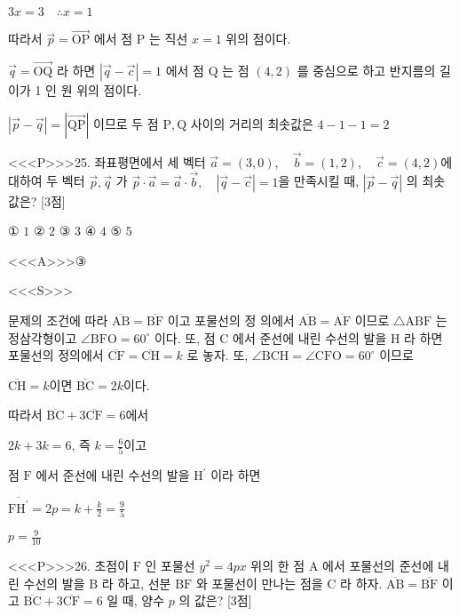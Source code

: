 \documentclass{oblivoir}
\begin{document}
$3 x=3 \quad \therefore x=1$

따라서 $\overrightarrow{p}=\overrightarrow{\mathrm{OP}}$ 에서 점 $\mathrm{P}$ 는 직선 $x=1$ 위의 점이다.

$\overrightarrow{q}=\overrightarrow{\mathrm{OQ}}$ 라 하면 $|\overrightarrow{q}-\overrightarrow{c}|=1$ 에서 점 $\mathrm{Q}$ 는 점 $(4,2)$ 를 중심으로 하고 반지름의 길이가 1 인 원 위의 점이다.

$|\overrightarrow{p}-\overrightarrow{q}|=|\overrightarrow{\mathrm{QP}}|$ 이므로 두 점 $\mathrm{P}, \mathrm{Q}$ 사이의 거리의 최솟값은 $4-1-1=2$


<<<P>>>25. 좌표평면에서 세 벡터 $\overrightarrow{a}=(3,0), \quad \overrightarrow{b}=(1,2), \quad \overrightarrow{c}=(4,2)$에 대하여 두 벡터 $\overrightarrow{p}, \overrightarrow{q}$ 가
$\overrightarrow{p} \cdot \overrightarrow{a}=\overrightarrow{a} \cdot \overrightarrow{b}, \quad|\overrightarrow{q}-\overrightarrow{c}|=1$을 만족시킬 때, $|\overrightarrow{p}-\overrightarrow{q}|$ 의 최솟값은? [3점]

① $1$
② $2$
③ $3$
④ $4$
⑤ $5$



<<<A>>>③

<<<S>>>



문제의 조건에 따라 $\overline{\mathrm{AB}}=\overline{\mathrm{BF}}$ 이고 포물선의 정 의에서 $\overline{\mathrm{AB}}=\overline{\mathrm{AF}}$ 이므로 $\triangle \mathrm{ABF}$ 는 정삼각형이고 $\angle \mathrm{BFO}=60^{\circ}$ 이다.
또, 점 $\mathrm{C}$ 에서 준선에 내린 수선의 발을 $\mathrm{H}$ 라 하면 포물선의 정의에서 $\overline{\mathrm{CF}}=\overline{\mathrm{CH}}=k$ 로 놓자.
또, $\angle \mathrm{BCH}=\angle \mathrm{CFO}=60^{\circ}$ 이므로

$\overline{\mathrm{CH}}=k$이면 $\overline{\mathrm{BC}}=2 k$이다.

따라서 $\overline{\mathrm{BC}}+3 \overline{\mathrm{CF}}=6$에서

$2 k+3 k=6$, 즉 $k=\frac{6}{5}$이고

점 $\mathrm{F}$ 에서 준선에 내린 수선의 발을 $\mathrm{H}^{\prime}$ 이라 하면

$\overline{\mathrm{FH}^{\prime}}=2 p=k+\frac{k}{2}=\frac{9}{5}$

$p=\frac{9}{10}$


<<<P>>>26. 초점이 $\mathrm{F}$ 인 포물선 $y^{2}=4 p x$ 위의 한 점 $\mathrm{A}$ 에서 포물선의 준선에 내린 수선의 발을 $\mathrm{B}$ 라 하고, 선분 $\mathrm{BF}$ 와 포물선이 만나는 점을 $\mathrm{C}$ 라 하자. $\overline{\mathrm{AB}}=\overline{\mathrm{BF}}$ 이고 $\overline{\mathrm{BC}}+3 \overline{\mathrm{CF}}=6$ 일 때, 양수 $p$ 의 값은? [3점]
\end{document}
